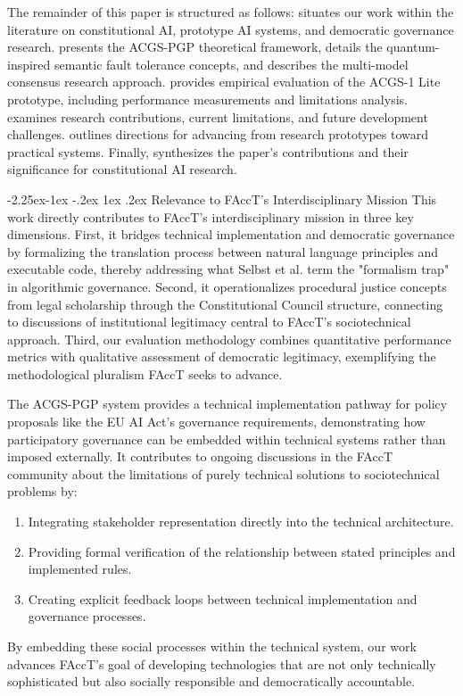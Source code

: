 \documentclass[manuscript,screen,9pt]{acmart}
\makeatletter
\renewcommand\subsection{\@startsection{subsection}{2}{\z@}%
  {-2.25ex\@plus -1ex \@minus -.2ex}%
  {1ex \@plus .2ex}%
  {\normalfont\large\bfseries}}
\makeatother
\begin{document}
The remainder of this paper is structured as follows:  situates our work within the literature on constitutional AI, prototype AI systems, and democratic governance research.  presents the ACGS-PGP theoretical framework, details the quantum-inspired semantic fault tolerance concepts, and describes the multi-model consensus research approach.  provides empirical evaluation of the ACGS-1 Lite prototype, including performance measurements and limitations analysis.  examines research contributions, current limitations, and future development challenges.  outlines directions for advancing from research prototypes toward practical systems. Finally,  synthesizes the paper's contributions and their significance for constitutional AI research.

\subsection{Relevance to FAccT's Interdisciplinary Mission}
\label{subsec:facct_relevance}
This work directly contributes to FAccT's interdisciplinary mission in three key dimensions. First, it bridges technical implementation and democratic governance by formalizing the translation process between natural language principles and executable code, thereby addressing what Selbst et al. \cite{Selbst2019FairnessAccountability} term the "formalism trap" in algorithmic governance. Second, it operationalizes procedural justice concepts from legal scholarship through the Constitutional Council structure, connecting to discussions of institutional legitimacy central to FAccT's sociotechnical approach. Third, our evaluation methodology combines quantitative performance metrics with qualitative assessment of democratic legitimacy, exemplifying the methodological pluralism FAccT seeks to advance.

The ACGS-PGP system provides a technical implementation pathway for policy proposals like the EU AI Act's governance requirements, demonstrating how participatory governance can be embedded within technical systems rather than imposed externally. It contributes to ongoing discussions in the FAccT community about the limitations of purely technical solutions to sociotechnical problems by:
\begin{enumerate}[leftmargin=*,itemsep=1pt,parsep=1pt]
    \item Integrating stakeholder representation directly into the technical architecture.
    \item Providing formal verification of the relationship between stated principles and implemented rules.
    \item Creating explicit feedback loops between technical implementation and governance processes.
\end{enumerate}
By embedding these social processes within the technical system, our work advances FAccT's goal of developing technologies that are not only technically sophisticated but also socially responsible and democratically accountable.
\end{document}
